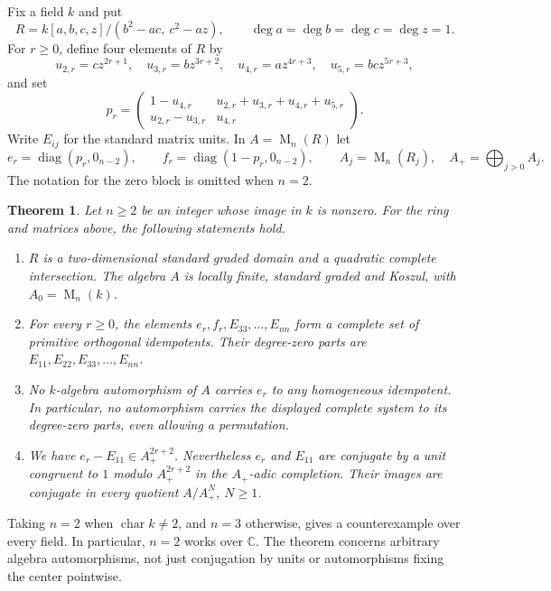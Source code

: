 \documentclass[11pt]{article}
\newtheorem{theorem}{Theorem}
\theoremstyle{remark}
\DeclareMathOperator{\Mat}{M}
\begin{document}
Fix a field $k$ and put
\begin{equation}\label{eq:ring}
 R=k[a,b,c,z]/(b^2-ac,\ c^2-az),\qquad
 \deg a=\deg b=\deg c=\deg z=1.
\end{equation}
For $r\geq0$, define four elements of $R$ by
\begin{equation}\label{eq:powers}
 u_{2,r}=cz^{2r+1},\quad u_{3,r}=bz^{3r+2},\quad
 u_{4,r}=az^{4r+3},\quad u_{5,r}=bcz^{5r+3},
\end{equation}
and set
\begin{equation}\label{eq:matrix}
 p_r=\begin{pmatrix}
 1-u_{4,r}&u_{2,r}+u_{3,r}+u_{4,r}+u_{5,r}\\
 u_{2,r}-u_{3,r}&u_{4,r}
 \end{pmatrix}.
\end{equation}
Write $E_{ij}$ for the standard matrix units. In $A=\Mat_n(R)$ let
\[
 e_r=\operatorname{diag}(p_r,0_{n-2}),\qquad
 f_r=\operatorname{diag}(1-p_r,0_{n-2}),\qquad
 A_j=\Mat_n(R_j),\quad A_+=\bigoplus_{j>0}A_j.
\]
The notation for the zero block is omitted when $n=2$.

\begin{theorem}\label{thm:main}
Let $n\geq2$ be an integer whose image in $k$ is nonzero. For the ring and matrices above, the following statements hold.
\begin{enumerate}
\item $R$ is a two-dimensional standard graded domain and a quadratic complete intersection. The algebra $A$ is locally finite, standard graded and Koszul, with $A_0=\Mat_n(k)$.
\item For every $r\geq0$, the elements $e_r,f_r,E_{33},\ldots,E_{nn}$ form a complete set of primitive orthogonal idempotents. Their degree-zero parts are $E_{11},E_{22},E_{33},\ldots,E_{nn}$.
\item No $k$-algebra automorphism of $A$ carries $e_r$ to any homogeneous idempotent. In particular, no automorphism carries the displayed complete system to its degree-zero parts, even allowing a permutation.
\item We have $e_r-E_{11}\in A_+^{2r+2}$. Nevertheless $e_r$ and $E_{11}$ are conjugate by a unit congruent to $1$ modulo $A_+^{2r+2}$ in the $A_+$-adic completion. Their images are conjugate in every quotient $A/A_+^N$, $N\geq1$.
\end{enumerate}
\end{theorem}

Taking $n=2$ when $\operatorname{char}k\ne2$, and $n=3$ otherwise, gives a counterexample over every field. In particular, $n=2$ works over $\mathbb C$. The theorem concerns arbitrary algebra automorphisms, not just conjugation by units or automorphisms fixing the center pointwise.
\end{document}
